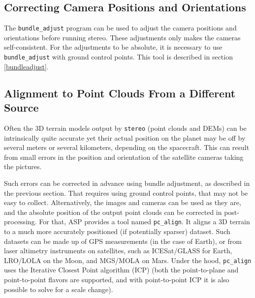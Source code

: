 %

\newpage

\subsection{Correcting Camera Positions and Orientations}

The \texttt{bundle\_adjust} program can be used to adjust the camera
positions and orientations before running stereo. These adjustments only
makes the cameras self-consistent. For the adjustments to be absolute,
it is necessary to use \texttt{bundle\_adjust} with ground control
points. This tool is described in section \ref{bundleadjust}.

\subsection{Alignment to Point Clouds From a Different Source}
\label{pc-align-example}
Often the 3D terrain models output by \texttt{stereo} (point
clouds and DEMs) can be intrinsically quite accurate yet their actual
position on the planet may be off by several meters or several
kilometers, depending on the spacecraft. This can result from small
errors in the position and orientation of the satellite cameras taking
the pictures.

Such errors can be corrected in advance using bundle adjustment, as
described in the previous section. That requires using ground control
points, that may not be easy to collect. Alternatively, the images and
cameras can be used as they are, and the absolute position of the output
point clouds can be corrected in post-processing. For that, ASP provides
a tool named \texttt{pc\_align}. It aligns a 3D terrain to a much more
accurately positioned (if potentially sparser) dataset. Such datasets
can be made up of GPS measurements (in the case of Earth), or from
laser altimetry instruments on satellites, such as ICESat/GLASS for
Earth, LRO/LOLA on the Moon, and MGS/MOLA on Mars.  Under the hood,
\texttt{pc\_align} uses the Iterative Closest Point algorithm (ICP)
(both the point-to-plane and point-to-point flavors are supported,
and with point-to-point ICP it is also possible to solve for a scale change).

